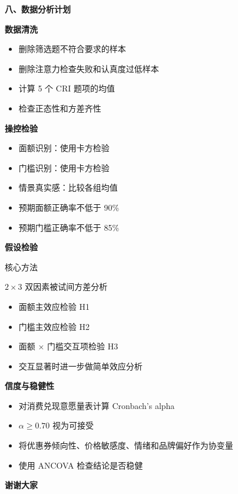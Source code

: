 \documentclass[aspectratio=169,UTF8,zihao=-4]{ctexbeamer}
\newcommand{\bigidea}[1]{
  \begin{center}
    \vspace{0.8em}
    {\LARGE \bfseries #1}
    \vspace{0.6em}
  \end{center}
}
\newcommand{\sectionpageframe}[1]{
  \begin{frame}[plain]
    \begin{center}
      \vfill
      {\Huge \bfseries #1}
      \vfill
    \end{center}
  \end{frame}
}
\begin{document}
\sectionpageframe{八、数据分析计划}

\begin{frame}
  \bigidea{数据清洗}
  \begin{itemize}
    \item \Large 删除筛选题不符合要求的样本
    \item \Large 删除注意力检查失败和认真度过低样本
    \item \Large 计算 5 个 CRI 题项的均值
    \item \Large 检查正态性和方差齐性
  \end{itemize}
\end{frame}

\begin{frame}
  \bigidea{操控检验}
  \begin{itemize}
    \item \Large 面额识别：使用卡方检验
    \item \Large 门槛识别：使用卡方检验
    \item \Large 情景真实感：比较各组均值
    \item \Large 预期面额正确率不低于 90\%
    \item \Large 预期门槛正确率不低于 85\%
  \end{itemize}
\end{frame}

\begin{frame}
  \bigidea{假设检验}
  \begin{block}{核心方法}
    \begin{center}
      {\Large $2 \times 3$ 双因素被试间方差分析}
    \end{center}
  \end{block}
  \begin{itemize}
    \item \Large 面额主效应检验 H1
    \item \Large 门槛主效应检验 H2
    \item \Large 面额 $\times$ 门槛交互项检验 H3
    \item \Large 交互显著时进一步做简单效应分析
  \end{itemize}
\end{frame}

\begin{frame}
  \bigidea{信度与稳健性}
  \begin{itemize}
    \item \Large 对消费兑现意愿量表计算 Cronbach's alpha
    \item \Large $\alpha \ge 0.70$ 视为可接受
    \item \Large 将优惠券倾向性、价格敏感度、情绪和品牌偏好作为协变量
    \item \Large 使用 ANCOVA 检查结论是否稳健
  \end{itemize}
\end{frame}

\begin{frame}
  \bigidea{谢谢大家}
\end{frame}
\end{document}
